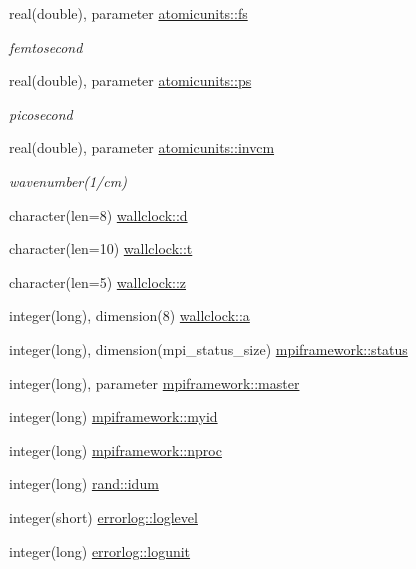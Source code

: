 \begin{DoxyCompactItemize}
real(double), parameter \hyperlink{namespaceatomicunits_a51f9c61f64f3aec674dd6dbb342e733d}{atomicunits\+::fs}
\begin{DoxyCompactList}\small\item\em femtosecond \end{DoxyCompactList}\item 
real(double), parameter \hyperlink{namespaceatomicunits_af5dac3bb123ac05a538d6ebd2373eb3b}{atomicunits\+::ps}
\begin{DoxyCompactList}\small\item\em picosecond \end{DoxyCompactList}\item 
real(double), parameter \hyperlink{namespaceatomicunits_a1741cd0f8cdd696033c1c18531740795}{atomicunits\+::invcm}
\begin{DoxyCompactList}\small\item\em wavenumber(1/cm) \end{DoxyCompactList}\item 
character(len=8) \hyperlink{namespacewallclock_a0922e57a4f1a99af864f31246c132d4c}{wallclock\+::d}
\item 
character(len=10) \hyperlink{namespacewallclock_a8a94eeecb39db73f1c36c9b00a95c9f7}{wallclock\+::t}
\item 
character(len=5) \hyperlink{namespacewallclock_a47a8e5d4efccd0142b0587c873dad88b}{wallclock\+::z}
\item 
integer(long), dimension(8) \hyperlink{namespacewallclock_a634d56ca30b98ea804c6d33a0a635ec0}{wallclock\+::a}
\item 
integer(long), dimension(mpi\+\_\+status\+\_\+size) \hyperlink{namespacempiframework_ab7c6b211b6d67a29e8b7e2cefe97d5b2}{mpiframework\+::status}
\item 
integer(long), parameter \hyperlink{namespacempiframework_ae3cf75bc4150b05cabe037cf7478d4a0}{mpiframework\+::master}
\item 
integer(long) \hyperlink{namespacempiframework_ae833a6cbdc45698ffa99a650f0e6bb2d}{mpiframework\+::myid}
\item 
integer(long) \hyperlink{namespacempiframework_af70b38210cb3bcccdc873618ffb3de35}{mpiframework\+::nproc}
\item 
integer(long) \hyperlink{namespacerand_a8271f5341966bf15edcabc95e23ffcec}{rand\+::idum}
\item 
integer(short) \hyperlink{namespaceerrorlog_a3ab7fc512e499660dcb9a9542aab02b5}{errorlog\+::loglevel}
\item 
integer(long) \hyperlink{namespaceerrorlog_adb26bb2d10f764e895c9745c3fb5dd1d}{errorlog\+::logunit}

\end{DoxyCompactItemize}
